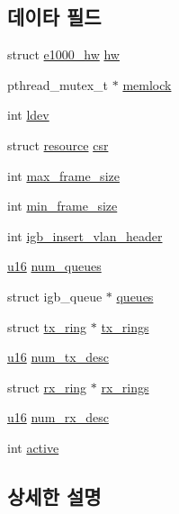 \subsection*{데이타 필드}
\begin{DoxyCompactItemize}
\item 
struct \hyperlink{structe1000__hw}{e1000\+\_\+hw} \hyperlink{structadapter_a7d5953861471302be6287c989e0b20ba}{hw}
\item 
pthread\+\_\+mutex\+\_\+t $\ast$ \hyperlink{structadapter_ac26455511b5639f92b1eadeae2f8e20e}{memlock}
\item 
int \hyperlink{structadapter_ae57c5756a3672ea1541cbc6dfd283161}{ldev}
\item 
struct \hyperlink{structresource}{resource} \hyperlink{structadapter_a0ca05bc0e64b6eb88e6fb380b688af4e}{csr}
\item 
int \hyperlink{structadapter_a09c29b0090a82147afdb50ae0013b9c6}{max\+\_\+frame\+\_\+size}
\item 
int \hyperlink{structadapter_a027b06fbbd3bf1152365ce98101e4583}{min\+\_\+frame\+\_\+size}
\item 
int \hyperlink{structadapter_a4051a7d0614eaeb9d13dbbafd2813fcb}{igb\+\_\+insert\+\_\+vlan\+\_\+header}
\item 
\hyperlink{lib_2igb_2e1000__osdep_8h_acdc9cf0314be0ae5a01d6d4379a95edd}{u16} \hyperlink{structadapter_a8befb466d4a5a6a432dc1648230e0a65}{num\+\_\+queues}
\item 
struct igb\+\_\+queue $\ast$ \hyperlink{structadapter_a53f5dff5b81b4cbf3d5b13bf21906cd9}{queues}
\item 
struct \hyperlink{structtx__ring}{tx\+\_\+ring} $\ast$ \hyperlink{structadapter_aec689462327aa3bf0e8a73e7cca2ae55}{tx\+\_\+rings}
\item 
\hyperlink{lib_2igb_2e1000__osdep_8h_acdc9cf0314be0ae5a01d6d4379a95edd}{u16} \hyperlink{structadapter_ab0bd5866ff13aa7c17436220693a3d2d}{num\+\_\+tx\+\_\+desc}
\item 
struct \hyperlink{structrx__ring}{rx\+\_\+ring} $\ast$ \hyperlink{structadapter_a59a5588ccfe1b0eefe45fcb9188b2f0a}{rx\+\_\+rings}
\item 
\hyperlink{lib_2igb_2e1000__osdep_8h_acdc9cf0314be0ae5a01d6d4379a95edd}{u16} \hyperlink{structadapter_a7a36fc7297d99f6b73c4b6a194b33efd}{num\+\_\+rx\+\_\+desc}
\item 
int \hyperlink{structadapter_aa5805c5e936174e5092bf7a5b78e7e64}{active}
\end{DoxyCompactItemize}


\subsection{상세한 설명}


